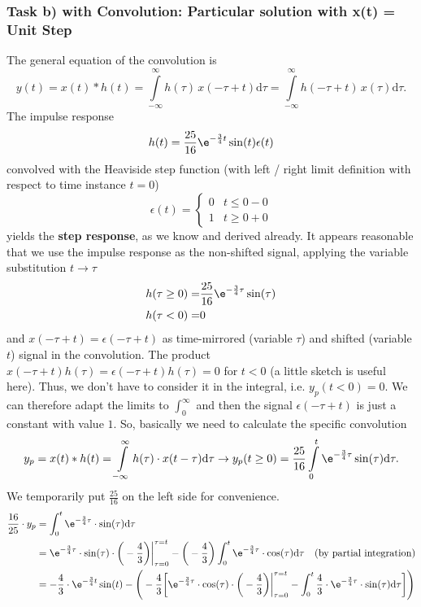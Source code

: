\subsubsection{Task b) with Convolution: Particular solution with x(t) = Unit Step}
The general equation of the convolution is
\begin{equation}
	y(t) = x(t) \ast h(t) =
	\int\limits_{-\infty}^{\infty}h(\tau) \, x(-\tau+t)\mathrm{d}\tau=
	\int\limits_{-\infty}^{\infty}h(-\tau+t)\, x(\tau)\mathrm{d}\tau.
\end{equation}
The impulse response
\begin{align}
h(t)=\frac{25}{16}\e^{-\frac{3}{4}t}\sin(t) \epsilon(t)
\end{align}
convolved with the Heaviside step function (with left / right limit definition
with respect to
time instance $t=0$)
\begin{equation}
\epsilon(t) =
\begin{cases}
  0 & t\leq 0-0\\
  1 & t\geq 0+0
\end{cases}
\end{equation}
yields the \textbf{step response}, as we know and derived already.
%
It appears reasonable that we use the impulse response as the non-shifted signal, applying the variable substitution $t \to \tau$
\begin{align}
h(\tau\geq 0) =& \frac{25}{16} \e^{-\frac{3}{4} \tau} \sin(\tau)\\
h(\tau < 0) =& 0
\end{align}
and $x(-\tau + t) = \epsilon(-\tau + t)$ as time-mirrored (variable $\tau$) and shifted (variable $t$)
signal in the convolution.
%
The product $x(-\tau + t) h(\tau) = \epsilon(-\tau + t) h(\tau) = 0$ for $t<0$ (a little
sketch is useful here). Thus, we don't have to consider it in the integral, i.e. $y_p(t<0)=0$.
%
We can therefore adapt the limits to $\int_0^\infty$ and then the signal $\epsilon(-\tau + t)$
is just a constant with value $1$.
%
So, basically we need to calculate the specific convolution
%
\begin{align}
	y_p = x(t) \ast h(t) =
	\int\limits_{-\infty}^{\infty}h(\tau)\cdot x(t-\tau)\mathrm{d}\tau\rightarrow
	y_p(t \geq 0) = \frac{25}{16}\int\limits_{0}^{t} \e^{-\frac{3}{4}\tau}\sin(\tau)\mathrm{d}\tau.
\end{align}
%
We temporarily put $\frac{25}{16}$ on the left side for convenience.
%
\begin{align}
	\frac{16}{25}\cdot y_p &= \int_0^t\e^{-\frac{3}{4}\tau}\cdot \sin(\tau)\mathrm{d}\tau\nonumber \\
	&= \e^{-\frac{3}{4}\tau}\cdot \sin(\tau)\cdot \bigg (-\frac{4}{3} \bigg )\bigg|_{\tau=0}^{\tau=t}-\bigg (-\frac{4}{3}\bigg )\int_0^t\e^{-\frac{3}{4}\tau}\cdot \cos(\tau)\mathrm{d}\tau \quad\text{(by partial integration)} \nonumber \\
	&= -\frac{4}{3}\cdot \e^{-\frac{3}{4}t}\sin(t)-\Bigg (-\frac{4}{3} \bigg [\e^{-\frac{3}{4}\tau}\cdot \cos(\tau)\cdot \bigg (-\frac{4}{3}\bigg )\bigg |_{\tau=0}^{\tau=t}-\int_0^t \frac{4}{3} \cdot \e^{-\frac{3}{4}\tau}\cdot \sin(\tau)\mathrm{d}\tau\bigg ] \Bigg ) \nonumber
\end{align}
